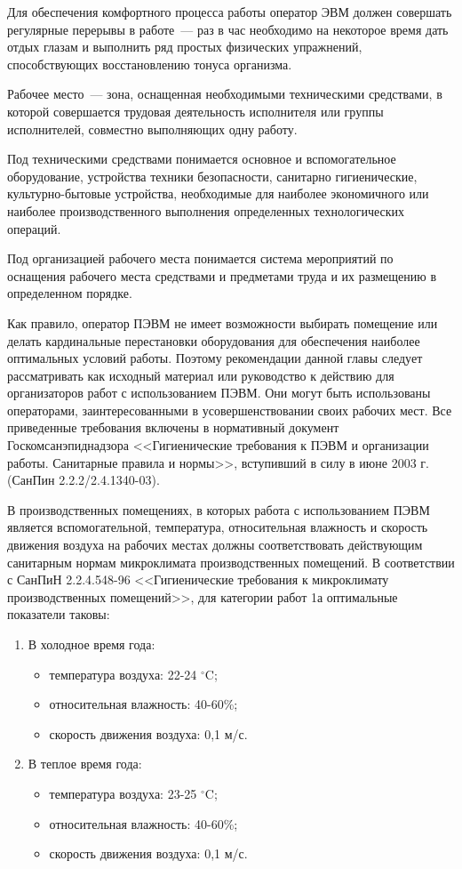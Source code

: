 Для обеспечения комфортного процесса работы оператор ЭВМ должен совершать регулярные перерывы в работе~--- раз в час необходимо на некоторое время дать отдых глазам и выполнить ряд простых физических упражнений, способствующих восстановлению тонуса организма.

Рабочее место~--- зона, оснащенная необходимыми техническими средствами, в которой совершается трудовая деятельность исполнителя или группы исполнителей, совместно выполняющих одну работу.

Под техническими средствами понимается основное и вспомогательное оборудование, устройства техники безопасности, санитарно гигиенические, культурно-бытовые устройства, необходимые для наиболее экономичного или наиболее производственного выполнения определенных технологических операций.

Под организацией рабочего места понимается система мероприятий по оснащения рабочего места средствами и предметами труда и их размещению в определенном порядке.

Как правило, оператор ПЭВМ не имеет возможности выбирать помещение или делать кардинальные перестановки оборудования для обеспечения наиболее оптимальных условий работы.
Поэтому рекомендации данной главы следует рассматривать как исходный материал или руководство к действию для организаторов работ с использованием ПЭВМ.
Они могут быть использованы операторами, заинтересованными в усовершенствовании своих рабочих мест.
Все приведенные требования включены в нормативный документ Госкомсанэпиднадзора <<Гигиенические требования к ПЭВМ и организации работы. Санитарные правила и нормы>>, вступивший в силу в июне 2003 г. (СанПин 2.2.2/2.4.1340-03).

В производственных помещениях, в которых работа с использованием ПЭВМ является вспомогательной, температура, относительная влажность и скорость движения воздуха на рабочих местах должны соответствовать действующим санитарным нормам микроклимата производственных помещений.
В соответствии с СанПиН 2.2.4.548-96 <<Гигиенические требования к микроклимату производственных помещений>>, для категории работ 1а оптимальные показатели таковы:
\begin{enumerate}
  \item В холодное время года:
  \begin{itemize}[leftmargin=*]
    \item температура воздуха: 22-24 $^{\circ}$C;
    \item относительная влажность: 40-60\%;
    \item скорость движения воздуха: 0,1 м/с.
  \end{itemize}
  \item В теплое время года:
  \begin{itemize}[leftmargin=*]
    \item температура воздуха: 23-25 $^{\circ}$C;
    \item относительная влажность: 40-60\%;
    \item скорость движения воздуха: 0,1 м/с.
  \end{itemize}
\end{enumerate}


